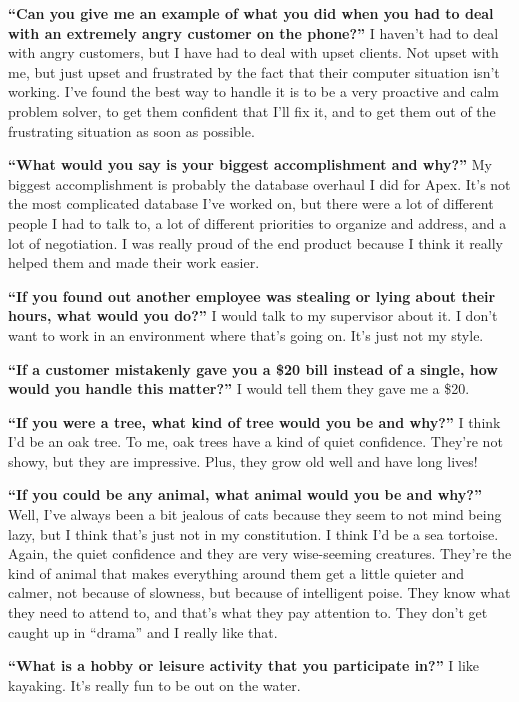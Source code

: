 \textbf{``Can you give me an example of what you did when you had to deal with an extremely angry customer on the phone?''}
\break I haven't had to deal with angry customers, but I have had to deal with upset clients. Not upset with me, but just upset and frustrated by the fact that their computer situation isn't working. I've found the best way to handle it is to be a very proactive and calm problem solver, to get them confident that I'll fix it, and to get them out of the frustrating situation as soon as possible.

\textbf{``What would you say is your biggest accomplishment and why?''}
\break My biggest accomplishment is probably the database overhaul I did for Apex. It's not the most complicated database I've worked on, but there were a lot of different people I had to talk to, a lot of different priorities to organize and address, and a lot of negotiation. I was really proud of the end product because I think it really helped them and made their work easier.

\textbf{``If you found out another employee was stealing or lying about their hours, what would you do?''}
\break I would talk to my supervisor about it. I don't want to work in an environment where that's going on. It's just not my style.

\textbf{``If a customer mistakenly gave you a \$20 bill instead of a single, how would you handle this matter?''}
\break I would tell them they gave me a \$20.

\textbf{``If you were a tree, what kind of tree would you be and why?''}
\break I think I'd be an oak tree. To me, oak trees have a kind of quiet confidence. They're not showy, but they are impressive. Plus, they grow old well and have long lives!

\textbf{``If you could be any animal, what animal would you be and why?''}
\break Well, I've always been a bit jealous of cats because they seem to not mind being lazy, but I think that's just not in my constitution. I think I'd be a sea tortoise. Again, the quiet confidence and they are very wise-seeming creatures. They're the kind of animal that makes everything around them get a little quieter and calmer, not because of slowness, but because of intelligent poise. They know what they need to attend to, and that's what they pay attention to. They don't get caught up in ``drama'' and I really like that.

\textbf{``What is a hobby or leisure activity that you participate in?'' }
\break I like kayaking. It's really fun to be out on the water.

